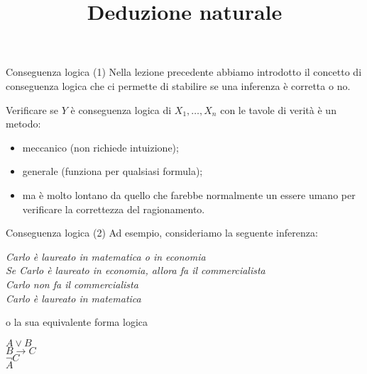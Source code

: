 \documentclass[aspectratio=169,10pt,dvipsnames,xcolor=table,handout]{beamer}
\title{Deduzione naturale}
\begin{document}
\begin{frame}
    \titlepage
\end{frame}

\begin{frame}{Conseguenza logica (1)}
    Nella lezione precedente abbiamo introdotto  il concetto di \alert{conseguenza logica} che ci permette di stabilire se una inferenza è corretta o no.


    \medskip
    Verificare se $Y$ è conseguenza logica di $X_1, \ldots, X_n$ con le tavole di verità è un metodo:
    \begin{itemize}
        \item meccanico (non richiede intuizione);
        \item generale (funziona per qualsiasi formula);
        \item ma è molto lontano da quello che farebbe normalmente un essere umano per verificare la correttezza del ragionamento.
    \end{itemize}
\end{frame}

\begin{frame}{Conseguenza logica (2)}
    Ad esempio, consideriamo la seguente inferenza:
    \begin{center}
        \begin{inference}
            \textit{Carlo è laureato in matematica o in economia}\\
            \textit{Se Carlo è laureato in economia, allora fa il commercialista}\\
            \textit{Carlo non fa il commercialista}\\
            \hline
            \textit{Carlo è laureato in matematica}
        \end{inference}
    \end{center}
    o la sua equivalente forma logica
    \begin{center}
        \begin{inference}
            $A \vee B$\\
            $B \to C$\\
            $\neg C$\\
            \hline
            $A$
        \end{inference}
    \end{center}
\end{frame}
\end{document}
